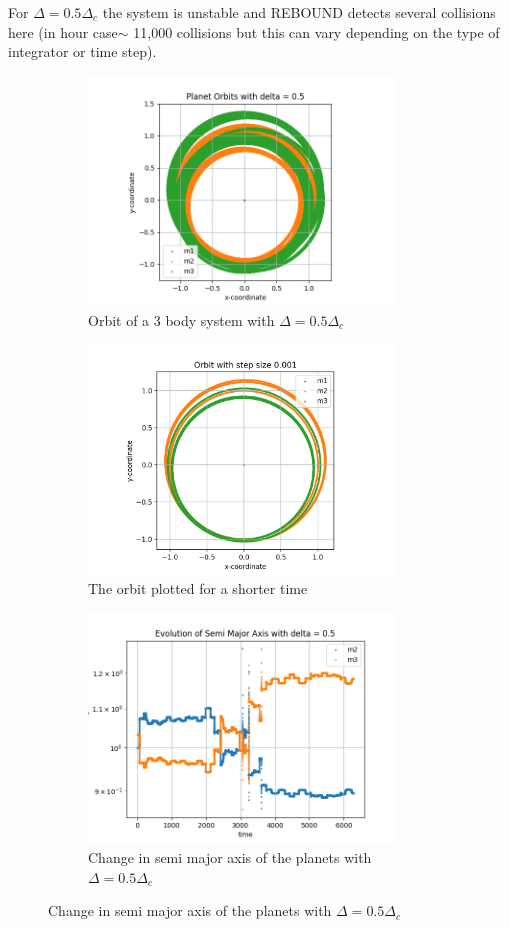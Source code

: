 \documentclass[12pt,a4paper]{article}
\begin{document}
For $\Delta=0.5\Delta_c$ the system is unstable and REBOUND detects several collisions here (in hour case$ \sim $ 11,000 collisions but this can vary depending on the type of integrator or time step).

\begin{figure}[H]
  \begin{subfigure}{0.4\textwidth}
    \centering
    \includegraphics[height = 2.4in]{3Body/3BD_orbit_delta0.5.png}
    \caption{Orbit of a 3 body system with $\Delta = 0.5\Delta_c$}
    \label{fig:3Body_0.5}
  \end{subfigure}
  \begin{subfigure}{0.4\textwidth}
    \centering
    \includegraphics[height = 2.4in]{3Body/3BD_orbit_delta0.5_short.png}
    \caption{The orbit plotted for a shorter time}
    \label{fig:3Body_0.5_short}
  \end{subfigure}
  \begin{subfigure}{0.4\textwidth}
    \centering
    \includegraphics[height = 2.4in]{3Body/3BD_a_delta0.5.png}
    \caption{Change in semi major axis of the planets with $\Delta = 0.5\Delta_c$}
    \label{fig:3Body_0.5_a}
  \end{subfigure}


\end{figure}
\end{document}
